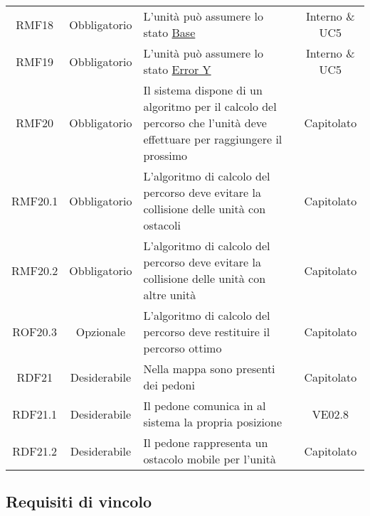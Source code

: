 \begin{longtable}[h!] { c c m{8cm} c}
		RMF18 & Obbligatorio & L'unità può assumere lo stato \underline{Base} & Interno \& UC5 \\
		
		RMF19 & Obbligatorio & L'unità può assumere lo stato \underline{Error Y} & Interno \& UC5 \\
		
		RMF20 & Obbligatorio & Il sistema dispone di un algoritmo per il calcolo del percorso che l'unità deve effettuare per raggiungere il prossimo \glock{POI} & Capitolato \\
		
		RMF20.1 & Obbligatorio & L'algoritmo di calcolo del percorso deve evitare la collisione delle unità con ostacoli & Capitolato \\
		
		RMF20.2 & Obbligatorio & L'algoritmo di calcolo del percorso deve evitare la collisione delle unità con altre unità & Capitolato \\
		
		ROF20.3 & Opzionale & L'algoritmo di calcolo del percorso deve restituire il percorso ottimo & Capitolato \\
		
		RDF21 & Desiderabile & Nella mappa sono presenti dei pedoni & Capitolato \\
		
		RDF21.1 & Desiderabile & Il pedone comunica in \glock{real-time} al sistema la propria posizione & VE02.8 \\
		
		RDF21.2 & Desiderabile & Il pedone rappresenta un ostacolo mobile per l'unità & Capitolato \\

	\end{longtable}

\newpage

\subsection{Requisiti di vincolo}


